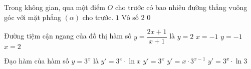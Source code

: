 \begin{ex}%
	Trong không gian, qua một điểm $O$ cho trước có bao nhiêu đường thẳng vuông góc với  mặt phẳng $(\alpha)$ cho trước.
	\choice
	{\True $1$}
	{Vô số}
	{$2$}
	{$0$}
\end{ex}

\begin{ex}%
	Đường tiệm cận ngang của đồ thị hàm số $y=\dfrac{2x+1}{x+1}$ là
	\choice
	{\True $y=2$}
	{$x=-1$}
	{$y=-1$}
	{$x=2$}
\end{ex}

\begin{ex}%
	Đạo hàm của hàm số $y=3^x$ là
	\choice
	{\True $y'=3^x \cdot \ln x$}
	{$y'=3^x$}
	{$y'=x\cdot 3^{x-1}$}
	{\True $y'=3^x\cdot \ln 3$}
\end{ex}

 
